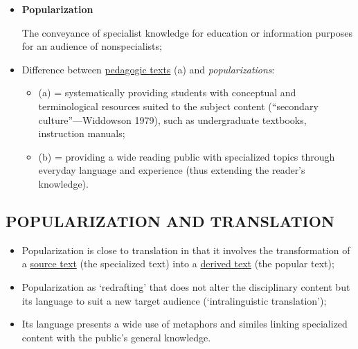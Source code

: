 \begin{itemize}

\item

\begin{defn}{\textbf{Popularization}}

The conveyance of specialist knowledge for education or information purposes for an audience of nonspecialists;

\end{defn}

\item Difference between \underline{pedagogic texts} (a) and \textit{popularizations}:

\begin{itemize}

\item (a) = systematically providing students with conceptual and terminological resources suited to the subject content (“secondary culture”—Widdowson 1979), such as undergraduate textbooks, instruction manuals;

\item (b) = providing a wide reading public with specialized topics through everyday language and experience (thus extending the reader’s knowledge). 

\end{itemize}

\end{itemize}

\subsection{POPULARIZATION AND TRANSLATION}

\begin{itemize}

\item Popularization is close to translation in that it involves the transformation of a \underline{source text} (the specialized text) into a \underline{derived text} (the popular text);

\item Popularization as ‘redrafting’ that does not alter the disciplinary content but its language to suit a new target audience (‘intralinguistic translation’); 

\item Its language presents a wide use of metaphors and similes linking specialized content with the public’s general knowledge.

\end{itemize}

